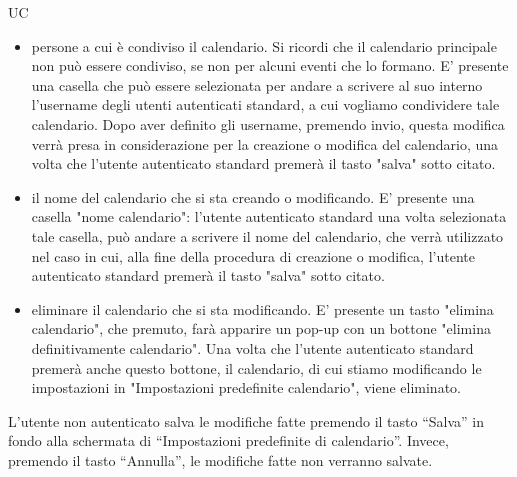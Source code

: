 \begin{listaPersonale}{UC}
\begin{listaPersonale2}[UC] {}
\begin{enumerate}
\begin{itemize}
                          \item persone a cui è condiviso il calendario. Si ricordi che il calendario principale non può essere condiviso, se non per alcuni eventi che lo formano. E' presente una casella che può essere selezionata per andare a scrivere al suo interno l'username degli utenti autenticati standard, a cui vogliamo condividere tale calendario.
                                Dopo aver definito gli username, premendo invio, questa modifica verrà presa in considerazione per la creazione o modifica del calendario, una volta che l'utente autenticato standard premerà il tasto "salva" sotto citato.
                          \item il nome del calendario che si sta creando o modificando. E' presente una casella "nome calendario": l'utente autenticato standard una volta selezionata tale casella, può andare a scrivere il nome del calendario, che verrà utilizzato nel caso in cui, alla fine della procedura di creazione o modifica, l'utente autenticato standard premerà il tasto "salva" sotto citato.
                          \item eliminare il calendario che si sta modificando. E' presente un tasto "elimina calendario", che premuto, farà apparire un pop-up con un bottone "elimina definitivamente calendario". Una volta che l'utente autenticato standard premerà anche questo bottone, il calendario, di cui stiamo modificando le impostazioni in "Impostazioni predefinite calendario", viene eliminato.
                      \end{itemize}
                      L'utente non autenticato salva le modifiche fatte premendo il tasto “Salva” in fondo alla schermata di “Impostazioni predefinite di calendario”. Invece, premendo il tasto “Annulla”, le modifiche fatte non verranno salvate.
            \end{enumerate}


\end{listaPersonale2}
\end{listaPersonale}
